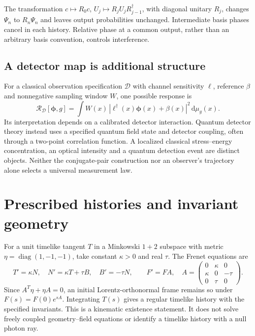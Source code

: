 \documentclass[aip,adv,reprint,onecolumn,amsmath,amssymb]{revtex4-2}
\newcommand{\dd}{\mathrm d}
\newcommand{\Ph}{\boldsymbol\phi}
\begin{document}
The transformation $c\mapsto R_0c$, $U_j\mapsto R_jU_jR_{j-1}^\dagger$, with diagonal unitary $R_j$, changes $\Psi_n$ to $R_n\Psi_n$ and leaves output probabilities unchanged. Intermediate basis phases cancel in each history. Relative phase at a common output, rather than an arbitrary basis convention, controls interference.

\subsection{A detector map is additional structure}
For a classical observation specification $\mathcal D$ with channel sensitivity $\ell$, reference $\beta$ and nonnegative sampling window $W$, one possible response is
\begin{equation}
 \mathcal R_{\mathcal D}[\Ph,g]=\int W(x)\,|\ell^\dagger(x)\Ph(x)+\beta(x)|^2\,\dd\mu_g(x).
 \label{eq:detector}
\end{equation}
Its interpretation depends on a calibrated detector interaction. Quantum detector theory instead uses a specified quantum field state and detector coupling, often through a two-point correlation function.\cite{unruh,louko} A localized classical stress--energy concentration, an optical intensity and a quantum detection event are distinct objects. Neither the conjugate-pair construction nor an observer's trajectory alone selects a universal measurement law.

\section{Prescribed histories and invariant geometry}
\label{app:geometry}
For a unit timelike tangent $T$ in a Minkowski $1+2$ subspace with metric $\eta=\operatorname{diag}(1,-1,-1)$, take constant $\kappa>0$ and real $\tau$. The Frenet equations are
\begin{equation}
 T'=\kappa N,\quad N'=\kappa T+\tau B,\quad B'=-\tau N,\qquad
 F'=FA,\quad A=\begin{pmatrix}0&\kappa&0\\\kappa&0&-\tau\\0&\tau&0\end{pmatrix}.
 \label{eq:frenet}
\end{equation}
Since $A^T\eta+\eta A=0$, an initial Lorentz-orthonormal frame remains so under $F(s)=F(0)e^{sA}$. Integrating $T(s)$ gives a regular timelike history with the specified invariants. This is a kinematic existence statement. It does not solve freely coupled geometry--field equations or identify a timelike history with a null photon ray.
\end{document}
